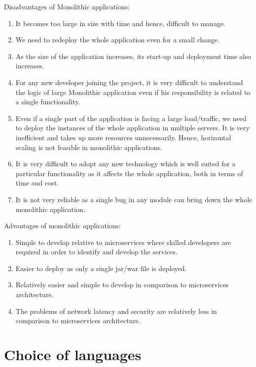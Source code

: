 Disadvantages of Monolithic applications:
\begin{enumerate}
      \item
            It becomes too large in size with time and hence, difficult to manage.
      \item
            We need to redeploy the whole application even for a small change.
      \item
            As the size of the application increases, its start-up and deployment time also increases.
      \item
            For any new developer joining the project, it is very difficult to understand the logic of large Monolithic application even if his responsibility is related to a single functionality.
      \item
            Even if a single part of the application is facing a large load/traffic, we need to deploy the instances of the whole application in multiple servers. It is very inefficient and takes up more resources unnecessarily. Hence, horizontal scaling is not feasible in monolithic applications.
      \item
            It is very difficult to adopt any new technology which is well suited for a particular functionality as it affects the whole application, both in terms of time and cost.
      \item
            It is not very reliable as a single bug in any module can bring down the whole monolithic application.
\end{enumerate}
Advantages of monolithic applications:
\begin{enumerate}
      \item
            Simple to develop relative to microservices where skilled developers are required in order to identify and develop the services.
      \item
            Easier to deploy as only a single jar/war file is deployed.
      \item
            Relatively easier and simple to develop in comparison to microservices architecture.
      \item
            The problems of network latency and security are relatively less in comparison to microservices architecture.
\end{enumerate}


\section{Choice of languages}

